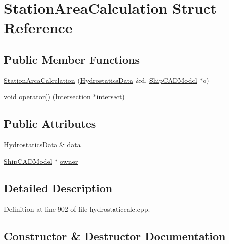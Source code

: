 \hypertarget{structStationAreaCalculation}{}\section{Station\+Area\+Calculation Struct Reference}
\label{structStationAreaCalculation}
\subsection*{Public Member Functions}
\begin{DoxyCompactItemize}
\item 
\hyperlink{structStationAreaCalculation_aeca509dbb47e4d9eca53b5e0c959dd79}{Station\+Area\+Calculation} (\hyperlink{structShipCAD_1_1HydrostaticsData}{Hydrostatics\+Data} \&d, \hyperlink{classShipCAD_1_1ShipCADModel}{Ship\+C\+A\+D\+Model} $\ast$o)
\item 
void \hyperlink{structStationAreaCalculation_a8f6cf7b08869c75ac1c54bff232ce2ed}{operator()} (\hyperlink{classShipCAD_1_1Intersection}{Intersection} $\ast$intersect)
\end{DoxyCompactItemize}
\subsection*{Public Attributes}
\begin{DoxyCompactItemize}
\item 
\hyperlink{structShipCAD_1_1HydrostaticsData}{Hydrostatics\+Data} \& \hyperlink{structStationAreaCalculation_ad1b380c3cc7135b5d659c7efb5a961c2}{data}
\item 
\hyperlink{classShipCAD_1_1ShipCADModel}{Ship\+C\+A\+D\+Model} $\ast$ \hyperlink{structStationAreaCalculation_a84d2ad6a33b1d6e2db182bebf0a5d7af}{owner}
\end{DoxyCompactItemize}


\subsection{Detailed Description}


Definition at line 902 of file hydrostaticcalc.\+cpp.



\subsection{Constructor \& Destructor Documentation}
